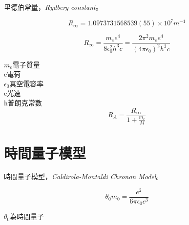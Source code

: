\documentclass[a4paper,notitlepage,UTF8]{ctexart}
\begin{document}
里德伯常量，{\it Rydberg constant}。

\begin{equation}
R_{\infty} = 1.0973731568539(55) \times 10^{7} m^{-1}
\end{equation}

\begin{equation}
R_{\infty}  = \frac{m_{e}e^{4}}{8\epsilon_{0}^{2}h^{3}c} = \frac{2\pi^{2}m_{e}e^{4}}{(4\pi\epsilon_{0})^{2}h^{3}c} 
\end{equation}


$m_{e}$電子質量
\\
e電荷
\\
$\epsilon_{0}$真空電容率
\\
c光速
\\
h普朗克常數
\\


\begin{equation}
R_{A} = \frac{R_{\infty}}{1+\frac{m_{e}}{M}}
\end{equation}






























\section{時間量子模型}

時間量子模型，{\it Caldirola-Montaldi Chronon Model}。

\begin{equation}
\theta_{0}m_{0} = \frac{e^{2}}{6\pi\epsilon_{0}c^{3}}
\end{equation}

$\theta_{0}$為時間量子
\end{document}
